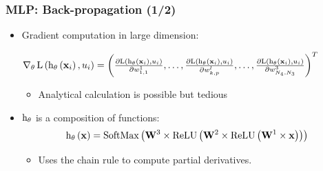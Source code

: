 \begin{frame}
  \frametitle{\acl{MLP}: Back-propagation (1/2)}
  \begin{itemize}
    \item Gradient computation in large dimension:

    $
    \operatorname{\nabla}_{\mathbf{\theta}} \mathrm{L} \left ( {\mathrm{h}_{\mathbf{\theta}} \left ( {\mathbf{x}_i} \right ), u_i} \right ) =
    \left( \frac{\partial \mathrm{L} \left ( {\mathrm{h}_{\mathbf{\theta}} \left ( {\mathbf{x}_i} \right ), u_i} \right ) }{\partial w_{1,1}^1},\ldots,\frac{\partial \mathrm{L} \left ( {\mathrm{h}_{\mathbf{\theta}} \left ( {\mathbf{x}_i} \right ), u_i} \right ) }{\partial w_{k,p}^l},\ldots,\frac{\partial \mathrm{L} \left ( {\mathrm{h}_{\mathbf{\theta}} \left ( {\mathbf{x}_i} \right ), u_i} \right ) }{\partial w_{N_{4},N_{3}}^{3}} \right)^T
    $

    \begin{itemize}
    \item Analytical calculation is possible but tedious
    \end{itemize}
  \item $\mathrm{h}_{\mathbf{\theta}}$ is a
      composition of functions:
      \[
        \apply{\hyp_{\params}}{\example} = \apply{\softMaxFunc}{%
          \weightMatrix^3 \times
          \apply{\ReLUFunc}{%
            \weightMatrix^2 \times
            \apply{\ReLUFunc}{%
              \weightMatrix^1 \times \example
            }
          }
        }
      \]
      \begin{itemize}
      \item Uses the chain rule to compute partial derivatives.
      \end{itemize}
  \end{itemize}

\end{frame}

